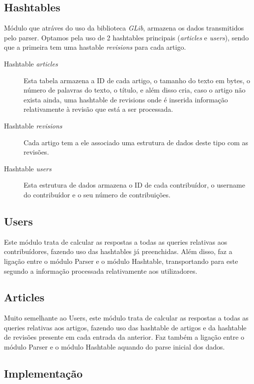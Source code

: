 \documentclass[a4paper]{article}
\begin{document}
\subsection{Hashtables}
Módulo que atráves do uso da biblioteca \textit{GLib}, armazena os dados transmitidos pelo parser. Optamos pela uso de 2 hashtables principais (\textit{articles} e \textit{users}), sendo que a primeira tem uma hastable \textit{revisions} para cada artigo.
\begin{description}
    \item[Hashtable \textit{articles}] Esta tabela armazena a ID de cada artigo, o tamanho do texto em bytes, o número de palavras do texto, o título, e além disso cria, caso o artigo não exista ainda, uma hashtable de revisions onde é inserida informação relativamente à revisão que está a ser processada.

    \item[Hashtable \textit{revisions}] Cada artigo tem a ele associado uma estrutura de dados deste tipo com as revisões.

    \item[Hashtable \textit{users}] Esta estrutura de dados armazena o ID de cada contribuídor, o username do contribuídor e o seu número de contribuições.

\end{description}

\subsection{Users}
 Este módulo trata de calcular as respostas a todas as queries relativas aos contribuídores, fazendo uso das hashtables já preenchidas. Além disso, faz a ligação entre o módulo Parser e o módulo Hashtable, transportando para este segundo a informação processada relativamente aos utilizadores.

\subsection{Articles}
 Muito semelhante ao Users, este módulo trata de calcular as respostas a todas as queries relativas aos artigos, fazendo uso das hashtable de artigos e da hashtable de revisões presente em cada entrada da anterior. Faz também a ligação entre o módulo Parser e o módulo Hashtable aquando do parse inicial dos dados.

\subsection{Implementação}
\end{document}

